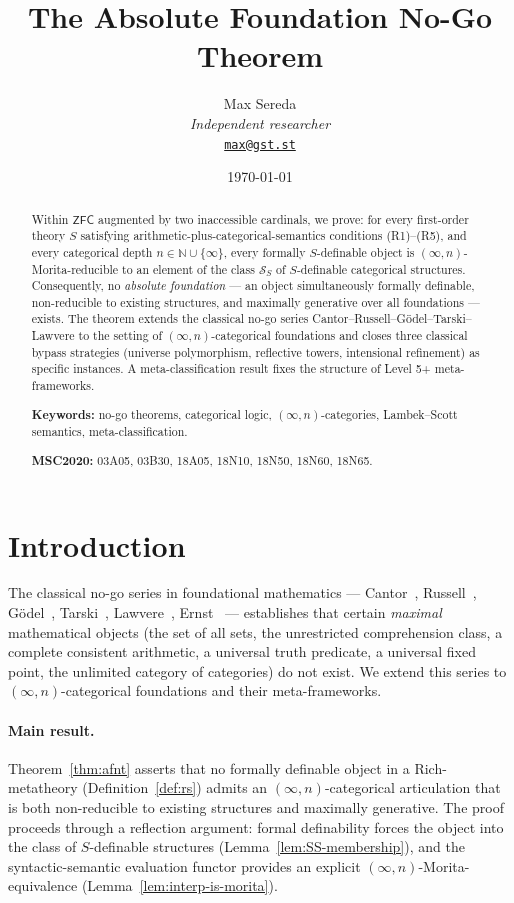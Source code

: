 \documentclass[11pt]{article}
\title{The Absolute Foundation No-Go Theorem}
\author{%
  \footnotesize Max Sereda \\[-3pt]
  \scriptsize\textit{Independent researcher} \\[-3pt]
  \scriptsize\texttt{\href{mailto:max@gst.st}{max@gst.st}}%
}
\date{\scriptsize\today}
\theoremstyle{plain}
\theoremstyle{definition}
\newcommand{\cS}{\mathcal{S}}
\newcommand{\ZFC}{\mathsf{ZFC}}
\begin{document}
\maketitle

\begin{abstract}
Within $\ZFC$ augmented by two inaccessible cardinals, we prove: for every first-order theory $S$ satisfying arithmetic-plus-categorical-semantics conditions (R1)--(R5), and every categorical depth $n \in \mathbb{N} \cup \{\infty\}$, every formally $S$-definable object is $(\infty, n)$-Morita-reducible to an element of the class $\cS_S$ of $S$-definable categorical structures. Consequently, no \emph{absolute foundation} --- an object simultaneously formally definable, non-reducible to existing structures, and maximally generative over all foundations --- exists. The theorem extends the classical no-go series Cantor--Russell--G\"odel--Tarski--Lawvere to the setting of $(\infty, n)$-categorical foundations and closes three classical bypass strategies (universe polymorphism, reflective towers, intensional refinement) as specific instances. A meta-classification result fixes the structure of Level 5+ meta-frameworks.

\medskip
\noindent\textbf{Keywords:} no-go theorems, categorical logic, $(\infty, n)$-categories, Lambek--Scott semantics, meta-classification.

\noindent\textbf{MSC2020:} 03A05, 03B30, 18A05, 18N10, 18N50, 18N60, 18N65.
\end{abstract}

\tableofcontents

\section{Introduction}\label{sec:intro}

The classical no-go series in foundational mathematics --- Cantor~\cite{Cantor1891}, Russell~\cite{Russell1903}, G\"odel~\cite{Godel1931}, Tarski~\cite{Tarski1936}, Lawvere~\cite{Lawvere1969}, Ernst~\cite{Ernst2015} --- establishes that certain \emph{maximal} mathematical objects (the set of all sets, the unrestricted comprehension class, a complete consistent arithmetic, a universal truth predicate, a universal fixed point, the unlimited category of categories) do not exist. We extend this series to $(\infty, n)$-categorical foundations and their meta-frameworks.

\paragraph{Main result.} Theorem~\ref{thm:afnt} asserts that no formally definable object in a Rich-metatheory (Definition~\ref{def:rs}) admits an $(\infty, n)$-categorical articulation that is both non-reducible to existing structures and maximally generative. The proof proceeds through a reflection argument: formal definability forces the object into the class of $S$-definable structures (Lemma~\ref{lem:SS-membership}), and the syntactic-semantic evaluation functor provides an explicit $(\infty, n)$-Morita-equivalence (Lemma~\ref{lem:interp-is-morita}).
\end{document}

